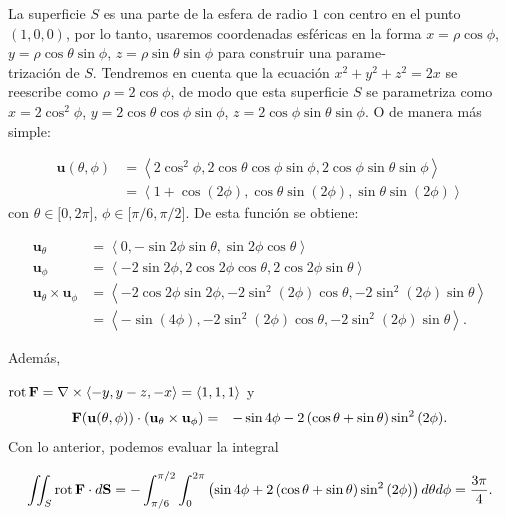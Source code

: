 La superficie $S$ es una parte de la esfera de radio $1$ con centro en el punto  $(1,0,0)$, por lo tanto, usaremos coordenadas esféricas en la forma $x=\rho \cos \phi $, $y=\rho \cos \theta \sin \phi $,
$z=\rho \sin \theta \sin \phi $ para construir una parame- \\ trización de $S$. Tendremos en cuenta que la ecuación $x^{2}+y^{2}+z^{2}=2x$ se reescribe como $\rho =2\cos \phi $,
de modo que esta superficie $S$ se parametriza como
$x=2\cos ^{2}\phi $, $y=2\cos \theta \cos \phi \sin \phi $, $z=2\cos \phi
\sin \theta \sin \phi $. O de manera más simple:

{\small
\begin{align*}
\mathbf{u}(\theta, \phi) &= \left \langle 2 \cos^2 \phi, 2 \cos \theta \cos \phi \sin \phi, 2 \cos \phi \sin \theta \sin \phi \right \rangle \\
&= \left \langle 1 + \cos (2\phi), \cos \theta \sin (2\phi), \sin \theta \sin (2\phi) \right \rangle
\end{align*}
}
con $\theta \in \lbrack 0,2\pi ]$, $\phi \in \lbrack \pi /6,\pi /2]$.
De esta función se obtiene:

{\small
\begin{align*}
\mathbf{u}_{\theta} &= \left \langle 0, -\sin 2\phi \sin \theta, \sin 2\phi \cos \theta \right \rangle \\
\mathbf{u}_{\phi} &= \left \langle -2 \sin 2\phi, 2 \cos 2\phi \cos \theta, 2 \cos 2\phi \sin \theta \right \rangle \\
\mathbf{u}_{\theta} \times \mathbf{u}_{\phi} &= \left \langle -2 \cos 2\phi \sin 2\phi, -2 \sin^2 (2\phi) \cos \theta, -2 \sin^2 (2\phi) \sin \theta \right \rangle \\
&= \left \langle -\sin (4\phi), -2 \sin^2 (2\phi) \cos \theta, -2 \sin^2 (2\phi) \sin \theta \right \rangle.
\end{align*}
}

Además,

${\rm rot}\,{\bf F}=\nabla \times \left\langle -y,y-z,-x\right\rangle =
\left\langle 1,1,1\right\rangle $
y
\begin{eqnarray*}
{\bf F}({\bf u}(\theta,\phi))\cdot ({\bf u}_{\theta }\times {\bf u}_{\phi }) &=& -\sin 4\phi -2\left( \cos \theta +\sin \theta \right) \sin^{2}\left( 2\phi \right)\!.
\end{eqnarray*}
Con lo anterior, podemos evaluar la integral

{\small
\begin{multline*}
\iint_S {\rm rot}\, {\bf F} \cdot d{\bf S} = -\int_{\pi /6}^{\pi /2}\int_{0}^{2\pi }\left( \sin 4\phi +2\left( \cos
\theta +\sin \theta \right) \sin ^{2}\left( 2\phi \right) \right) d\theta d\phi = \frac{3\pi}{4}.
\end{multline*}
}

